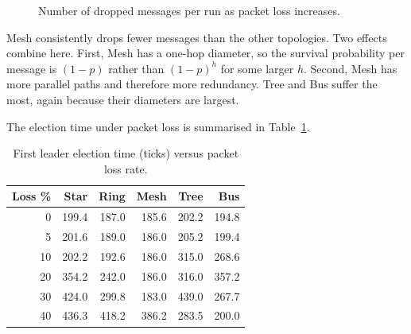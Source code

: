 \begin{figure}[H]
\centering
{}
\caption{Number of dropped messages per run as packet loss increases.}
\label{fig:exp4_dropped}
\end{figure}

Mesh consistently drops fewer messages than the other topologies. Two effects combine here. First, Mesh has a one-hop diameter, so the survival probability per message is $(1-p)$ rather than $(1-p)^h$ for some larger $h$. Second, Mesh has more parallel paths and therefore more redundancy. Tree and Bus suffer the most, again because their diameters are largest.

The election time under packet loss is summarised in Table~\ref{tab:exp4_election}.

\begin{table}[H]
\centering
\caption{First leader election time (ticks) versus packet loss rate.}
\label{tab:exp4_election}
\begin{tabular}{rrrrrr}
\toprule
\textbf{Loss \%} & \textbf{Star} & \textbf{Ring} & \textbf{Mesh} & \textbf{Tree} & \textbf{Bus} \\
\midrule
0  & 199.4 & 187.0 & 185.6 & 202.2 & 194.8 \\
5  & 201.6 & 189.0 & 186.0 & 205.2 & 199.4 \\
10 & 202.2 & 192.6 & 186.0 & 315.0 & 268.6 \\
20 & 354.2 & 242.0 & 186.0 & 316.0 & 357.2 \\
30 & 424.0 & 299.8 & 183.0 & 439.0 & 267.7 \\
40 & 436.3 & 418.2 & 386.2 & 283.5 & 200.0 \\
\bottomrule
\end{tabular}
\end{table}

